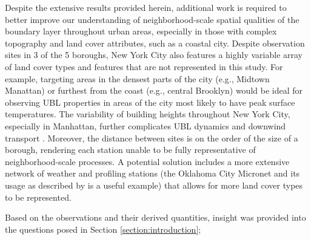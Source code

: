 Despite the extensive results provided herein, additional work is required to better improve our understanding of neighborhood-scale spatial qualities of the boundary layer throughout urban areas, especially in those with complex topography and land cover attributes, such as a coastal city. Despite observation sites in 3 of the 5 boroughs, New York City also features a highly variable array of land cover types and features that are not represented in this study. For example, targeting areas in the densest parts of the city (e.g., Midtown Manattan) or furthest from the coast (e.g., central Brooklyn) would be ideal for observing UBL properties in areas of the city most likely to have peak surface temperatures. The variability of building heights throughout New York City, especially in Manhattan, further complicates UBL dynamics and downwind transport \citep{hanna2006, hanna2007}. Moreover, the distance between sites is on the order of the size of a borough, rendering each station unable to be fully representative of neighborhood-scale processes. A potential solution includes a more extensive network of weather and profiling stations (the Oklahoma City Micronet and its usage as described by \citet{basara2010} is a useful example) that allows for more land cover types to be represented.

Based on the observations and their derived quantities, insight was provided into the questions posed in Section \ref{section:introduction};

